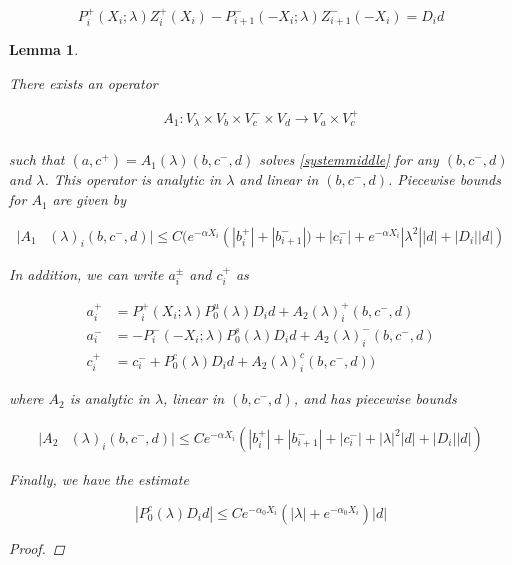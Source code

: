 \documentclass[12pt]{article}
\newtheorem{lemma}{Lemma}
\begin{document}
\[
P_i^+(X_i; \lambda) Z_i^+(X_i) - P_{i+1}^-(-X_i; \lambda) Z_{i+1}^-(-X_i) = D_i d
\]


\begin{lemma}\label{inv1}

There exists an operator

\begin{align*}
A_1: V_\lambda \times V_b \times V_c^- \times V_d \rightarrow V_a \times V_c^+\\
\end{align*}

such that $(a, c^+) = A_1(\lambda)(b, c^-,d)$ solves \eqref{systemmiddle} for any $(b, c^-,d)$ and $\lambda$. This operator is analytic in $\lambda$ and linear in $(b,c^-,d)$. Piecewise bounds for $A_1$ are given by

\begin{align}\label{A1bound}
|A_1&(\lambda)_i(b, c^-, d)|
\leq C \Big( e^{-\alpha X_i} \left( |b_i^+| + |b_{i+1}^-|) + |c_i^-| + e^{-\alpha X_i} |\lambda^2||d| + |D_i||d| \right)
\end{align} 

In addition, we can write $a_i^\pm$ and $c_i^+$ as 

\begin{align*}
a_i^+ &= P_i^+(X_i; \lambda) P_0^u(\lambda) D_i d + A_2(\lambda)_i^+(b, c^-, d) \\
a_i^- &= -P_i^-(-X_i; \lambda) P_0^s(\lambda) D_i d + A_2(\lambda)_i^-(b, c^-, d) \\
c_i^+ &= c_i^- + P_0^c(\lambda) D_i d + A_2(\lambda)_i^c(b, c^-, d) )
\end{align*}

where $A_2$ is analytic in $\lambda$, linear in $(b, c^-, d)$, and has piecewise bounds

\begin{align*}
|A_2&(\lambda)_i(b, c^-, d)|
\leq C e^{-\alpha X_i} \left( |b_i^+| + |b_{i+1}^-| + |c_i^-| + |\lambda|^2|d| + |D_i||d| \right)
\end{align*}

Finally, we have the estimate

\begin{equation}\label{P0cDid}
|P_0^c(\lambda) D_i d| \leq C e^{-\alpha_0 X_i}(|\lambda| + e^{-\alpha_0 X_i})|d|
\end{equation}

\begin{proof}


\end{proof}
\end{lemma}
\end{document}
